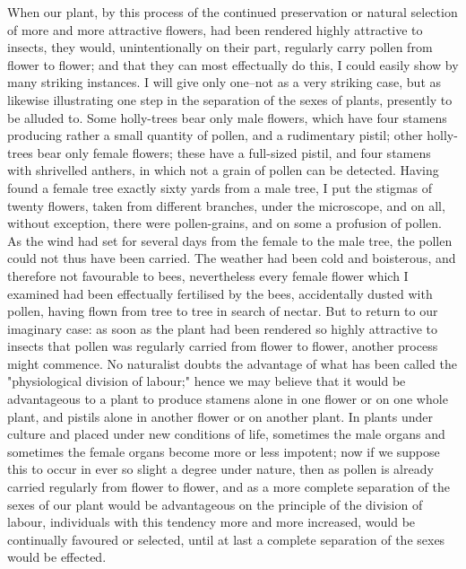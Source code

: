 When our plant, by this process of the continued preservation or natural selection of more and more attractive flowers, had been rendered highly attractive to insects, they would, unintentionally on their part, regularly carry pollen from flower to flower; and that they can most effectually do this, I could easily show by many striking instances. I will give only one--not as a very striking case, but as likewise illustrating one step in the separation of the sexes of plants, presently to be alluded to. Some holly-trees bear only male flowers, which have four stamens producing rather a small quantity of pollen, and a rudimentary pistil; other holly-trees bear only female flowers; these have a full-sized pistil, and four stamens with shrivelled anthers, in which not a grain of pollen can be detected. Having found a female tree exactly sixty yards from a male tree, I put the stigmas of twenty flowers, taken from different branches, under the microscope, and on all, without exception, there were pollen-grains, and on some a profusion of pollen. As the wind had set for several days from the female to the male tree, the pollen could not thus have been carried. The weather had been cold and boisterous, and therefore not favourable to bees, nevertheless every female flower which I examined had been effectually fertilised by the bees, accidentally dusted with pollen, having flown from tree to tree in search of nectar. But to return to our imaginary case: as soon as the plant had been rendered so highly attractive to insects that pollen was regularly carried from flower to flower, another process might commence. No naturalist doubts the advantage of what has been called the "physiological division of labour;" hence we may believe that it would be advantageous to a plant to produce stamens alone in one flower or on one whole plant, and pistils alone in another flower or on another plant. In plants under culture and placed under new conditions of life, sometimes the male organs and sometimes the female organs become more or less impotent; now if we suppose this to occur in ever so slight a degree under nature, then as pollen is already carried regularly from flower to flower, and as a more complete separation of the sexes of our plant would be advantageous on the principle of the division of labour, individuals with this tendency more and more increased, would be continually favoured or selected, until at last a complete separation of the sexes would be effected.

